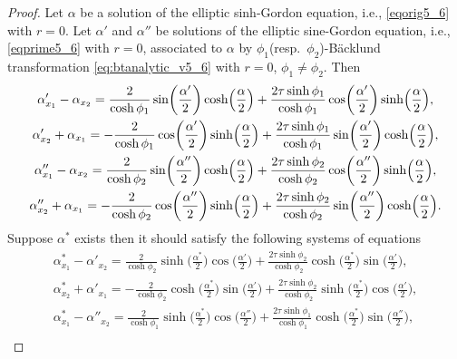 \documentclass[10pt,a4paper]{amsart}
\numberwithin{equation}{section}
\begin{document}
\begin{proof} Let $\alpha$ be a solution of the elliptic sinh-Gordon equation, i.e., \eqref{eqorig5_6} with $r=0$.
Let $\alpha'$ and $\alpha''$ be solutions of the elliptic sine-Gordon equation, i.e., \eqref{eqprime5_6} with $r=0$, associated to $\alpha$
by $\phi_1$(resp.\ $\phi_2$)-B\"acklund transformation \eqref{eq:btanalytic_v5_6} with $r=0$, $\phi_1\neq \phi_2$. Then
 \begin{gather}
\alpha'_{x_1}-\alpha_{x_2}=\frac{2}{\cosh\phi_1}\sin \biggl(\frac{\alpha'}{2}\biggr)\cosh \Bigl(\frac{\alpha}{2}\Bigr)+\frac{2\tau\sinh\phi_1}{\cosh\phi_1} \cos\biggl(\frac{\alpha'}{2}\biggr)\sinh \Bigl(\frac{\alpha}{2}\Bigr),\nonumber\\
\alpha'_{x_2}+\alpha_{x_1}=-\frac{2}{\cosh\phi_1}\cos\biggl(\frac{\alpha'}{2}\biggr)\sinh\Bigl(\frac{\alpha}{2}\Bigr)+\frac{2\tau\sinh\phi_1}{\cosh\phi_1} \sin\biggl(\frac{\alpha'}{2}\biggr)\cosh\Bigl(\frac{\alpha}{2}\Bigr),\label{BTcase51}\\
\alpha''_{x_1}-\alpha_{x_2}=\frac{2}{\cosh\phi_2}\sin\biggl(\frac{\alpha''}{2}\biggr)\cosh \Bigl(\frac{\alpha}{2}\Bigr)+\frac{2\tau\sinh\phi_2}{\cosh\phi_2} \cos\biggl(\frac{\alpha''}{2}\biggr)\sinh\Bigl(\frac{\alpha}{2}\Bigr),\nonumber\\
\alpha''_{x_2}+\alpha_{x_1}=-\frac{2}{\cosh\phi_2}\cos\biggl(\frac{\alpha''}{2}\biggr)\sinh\Bigl(\frac{\alpha}{2}\Bigr)+\frac{2\tau\sinh\phi_2}{\cosh\phi_2} \sin\biggl(\frac{\alpha''}{2}\biggr)\cosh\Bigl(\frac{\alpha}{2}\Bigr).\label{BTcase52}
\end{gather}
Suppose $\alpha^*$ exists then it should satisfy the following
systems of equations
\begin{gather}
\alpha^*_{x_1}-\alpha'_{x_2}=\frac{2}{\cosh\phi_2}\sinh\biggl(\frac{\alpha^*}{2}\biggr)\cos\biggl(\frac{\alpha'}{2}\biggr)+\frac{2\tau\sinh\phi_2}{\cosh\phi_2} \cosh\biggl(\frac{\alpha^*}{2}\biggr)\sin\biggl(\frac{\alpha'}{2}\biggr),\nonumber\\
\alpha^*_{x_2}+\alpha'_{x_1}=-\frac{2}{\cosh\phi_ 2}\cosh\biggl(\frac{\alpha^*}{2}\biggr)\sin\biggl(\frac{\alpha'}{2}\biggr)+\frac{2\tau\sinh\phi_2}{\cosh\phi_2} \sinh\biggl(\frac{\alpha^*}{2}\biggr)\cos\biggl(\frac{\alpha'}{2}\biggr),\label{BTcase62}
\\
\alpha^*_{x_1}-\alpha''_{x_2}=\frac{2}{\cosh\phi_1}\sinh\biggl(\frac{\alpha^*}{2}\biggr)\cos\biggl(\frac{\alpha''}{2}\biggr)+\frac{2\tau\sinh\phi_1}{\cosh\phi_1} \cosh\biggl(\frac{\alpha^*}{2}\biggr)\sin\biggl(\frac{\alpha''}{2}\biggr),\nonumber\\

\end{gather}
\end{proof}
\end{document}
